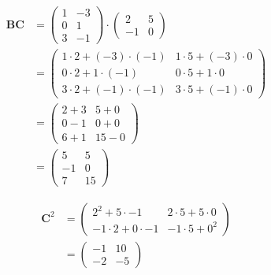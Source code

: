 \documentclass{tufte-handout}
\begin{document}
\begin{question}
\begin{align*}
\textbf{BC}
&= 
    \begin{pmatrix}
        1 & -3\\
        0 & 1\\
        3 & -1
    \end{pmatrix}
    \cdot{
        \begin{pmatrix}
            2 & 5\\
            -1 & 0
        \end{pmatrix}
    }\\[15pt]
&=
    \begin{pmatrix}
        1\cdot{2}+(-3)\cdot{(-1)} & 1\cdot{5}+(-3)\cdot{0}\\
        0\cdot{2}+1\cdot{(-1)} & 0\cdot{5}+1\cdot{0}\\
        3\cdot{2}+(-1)\cdot{(-1)} & 3\cdot{5}+(-1)\cdot{0}
    \end{pmatrix}\\[15pt]
&=
    \begin{pmatrix}
        2+3 & 5+0\\
        0-1 & 0+0\\
        6+1 & 15-0
    \end{pmatrix}\\[15pt]
&=
    \begin{pmatrix}
        5 & 5\\
        -1 & 0\\
        7 & 15
    \end{pmatrix}
\end{align*}

\vspace{5cm}

    \qsubpart
    
    \marginnote{\[ A^{2} = 
    \begin{pmatrix}
        a^{2}+bc & ab+bd\\
        ca + dc & cb+d^{2}
    \end{pmatrix} \]}

    \begin{align*}
    \mathbf{C}^{2} 
    &=
        \begin{pmatrix}
            2^{2}+ 5\cdot{-1} & 2\cdot{5}+ 5\cdot{0}\\
            -1\cdot{2} +0\cdot{-1} & -1\cdot{5} + 0^{2} 
        \end{pmatrix} \\[15pt]
    &=
        \begin{pmatrix}
            -1 & 10\\
            -2 & -5
        \end{pmatrix}
\end{align*}


\end{question}
\end{document}
